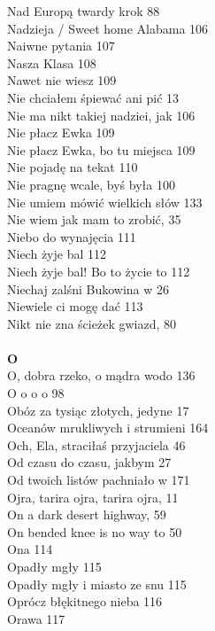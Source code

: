\documentclass[a5paper, 10pt]{book}
\begin{document}
{\begin{multicols}{3}
    Nad Europą twardy krok 88\\
    Nadzieja / Sweet home Alabama 106\\
    Naiwne pytania 107\\
    Nasza Klasa 108\\
    Nawet nie wiesz 109\\
    Nie chciałem śpiewać ani pić 13\\
    Nie ma nikt takiej nadziei, jak 106\\
    Nie płacz Ewka 109\\
    Nie płacz Ewka, bo tu miejsca 109\\
    Nie pojadę na tekat 110\\
    Nie pragnę wcale, byś była 100\\
    Nie umiem mówić wielkich słów 133\\
    Nie wiem jak mam to zrobić, 35\\
    Niebo do wynajęcia 111\\
    Niech żyje bal 112\\
    Niech żyje bal! Bo to życie to 112\\
    Niechaj zalśni Bukowina w 26\\
    Niewiele ci mogę dać 113\\
    Nikt nie zna ścieżek gwiazd, 80\\
    \\
    {\footnotesize \textbf{O\\} }
    O, dobra rzeko, o mądra wodo 136\\
    O o o o 98\\
    Obóz za tysiąc złotych, jedyne 17\\
    Oceanów mrukliwych i strumieni 164\\
    Och, Ela, straciłaś przyjaciela 46\\
    Od czasu do czasu, jakbym 27\\
    Od twoich listów pachniało w 171\\
    Ojra, tarira ojra, tarira ojra, 11\\
    On a dark desert highway, 59\\
    On bended knee is no way to 50\\
    Ona 114\\
    Opadły mgły 115\\
    Opadły mgły i miasto ze snu 115\\
    Oprócz błękitnego nieba 116\\
    Orawa 117\\

\end{multicols}}
\end{document}
